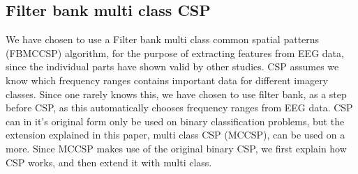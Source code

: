 \subsection{Filter bank multi class CSP}
We have chosen to use a Filter bank multi class common spatial patterns (FBMCCSP) algorithm, for the purpose of extracting features from EEG data, since the individual parts have shown valid by other studies. CSP assumes we know which frequency ranges contains important data for different imagery classes. Since one rarely knows this, we have chosen to use filter bank, as a step before CSP, as this automatically chooses frequency ranges from EEG data. CSP can in it's original form only be used on binary classification problems, but the extension explained in this paper, multi class CSP (MCCSP), can be used on a more. Since MCCSP makes use of the original binary CSP, we first explain how CSP works, and then extend it with multi class.

